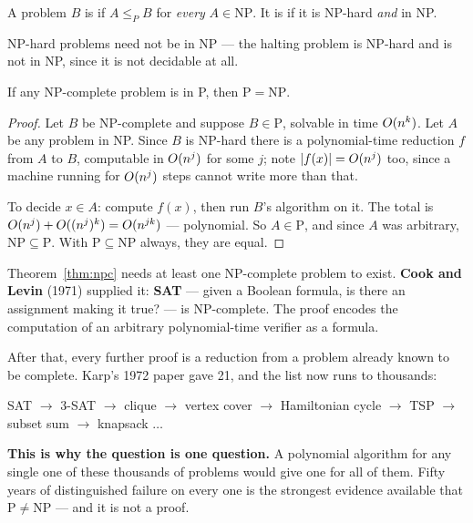 \begin{definitionbox}
A problem $B$ is  if $A \le_{P} B$ for \emph{every}
$A \in \mathrm{NP}$. It is  if it is NP-hard \emph{and} in NP.

\smallskip
NP-hard problems need not be in NP --- the halting problem is NP-hard and is
not in NP, since it is not decidable at all.
\end{definitionbox}

\begin{theorem}\label{thm:npc}
If any NP-complete problem is in P, then $\mathrm{P} = \mathrm{NP}$.
\end{theorem}

\begin{proof}
Let $B$ be NP-complete and suppose $B \in \mathrm{P}$, solvable in time
$O(n^{k})$. Let $A$ be any problem in NP. Since $B$ is NP-hard there is a
polynomial-time reduction $f$ from $A$ to $B$, computable in $O(n^{j})$ for
some $j$; note $|f(x)| = O(n^{j})$ too, since a machine running for
$O(n^{j})$ steps cannot write more than that.

\smallskip
To decide $x \in A$: compute $f(x)$, then run $B$'s algorithm on it. The total
is $O(n^{j}) + O((n^{j})^{k}) = O(n^{jk})$ --- polynomial. So
$A \in \mathrm{P}$, and since $A$ was arbitrary, $\mathrm{NP} \subseteq
\mathrm{P}$. With $\mathrm{P} \subseteq \mathrm{NP}$ always, they are equal.
\end{proof}

\begin{conceptbox}
Theorem~\ref{thm:npc} needs at least one NP-complete problem to exist.
\textbf{Cook and Levin} (1971) supplied it: \textbf{SAT} --- given a Boolean
formula, is there an assignment making it true? --- is NP-complete. The proof
encodes the computation of an arbitrary polynomial-time verifier as a formula.

\smallskip
After that, every further proof is a reduction from a problem already known to
be complete. Karp's 1972 paper gave 21, and the list now runs to thousands:
\begin{center}
SAT $\to$ 3-SAT $\to$ clique $\to$ vertex cover $\to$ Hamiltonian cycle
$\to$ TSP $\to$ subset sum $\to$ knapsack $\ldots$
\end{center}

\smallskip
\textbf{This is why the question is one question.} A polynomial algorithm for
any single one of these thousands of problems would give one for all of them.
Fifty years of distinguished failure on every one is the strongest evidence
available that $\mathrm{P} \ne \mathrm{NP}$ --- and it is not a proof.
\end{conceptbox}


